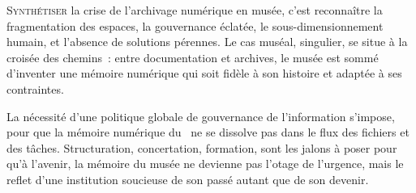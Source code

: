 


\bigskip
\bigskip
\bigskip

\lettrine{S}{ynthétiser} la crise de l’archivage numérique en musée, c’est reconnaître la fragmentation des espaces, la gouvernance éclatée, le sous-dimensionnement humain, et l’absence de solutions pérennes. Le cas muséal, singulier, se situe à la croisée des chemins~: entre documentation et archives, le musée est sommé d’inventer une mémoire numérique qui soit fidèle à son histoire et adaptée à ses contraintes.

La nécessité d’une politique globale de gouvernance de l’information s’impose, pour que la mémoire numérique du \mae~ne se dissolve pas dans le flux des fichiers et des tâches. Structuration, concertation, formation, sont les jalons à poser pour qu’à l’avenir, la mémoire du musée ne devienne pas l’otage de l’urgence, mais le reflet d’une institution soucieuse de son passé autant que de son devenir.
